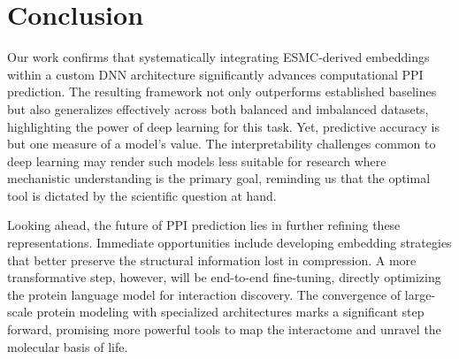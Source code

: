 \documentclass{article}
\begin{document}
	\section{Conclusion}

Our work confirms that systematically integrating ESMC-derived embeddings within a custom DNN architecture significantly advances computational PPI prediction. The resulting framework not only outperforms established baselines but also generalizes effectively across both balanced and imbalanced datasets, highlighting the power of deep learning for this task. Yet, predictive accuracy is but one measure of a model's value. The interpretability challenges common to deep learning may render such models less suitable for research where mechanistic understanding is the primary goal, reminding us that the optimal tool is dictated by the scientific question at hand.

Looking ahead, the future of PPI prediction lies in further refining these representations. Immediate opportunities include developing embedding strategies that better preserve the structural information lost in compression. A more transformative step, however, will be end-to-end fine-tuning, directly optimizing the protein language model for interaction discovery. The convergence of large-scale protein modeling with specialized architectures marks a significant step forward, promising more powerful tools to map the interactome and unravel the molecular basis of life.

	
	
	
	
	
\end{document}
